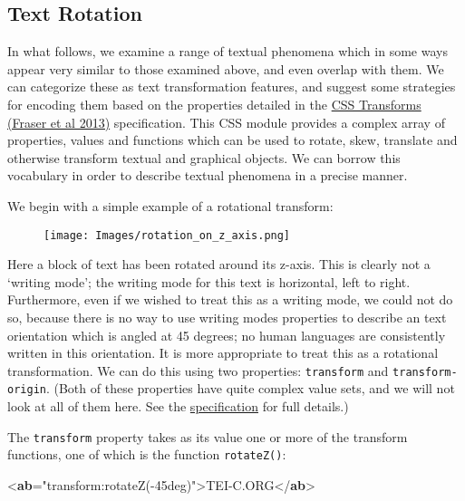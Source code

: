 \subsection[{Text Rotation}]{Text Rotation}\label{WDWMTT}\par
In what follows, we examine a range of textual phenomena which in some ways appear very similar to those examined above, and even overlap with them. We can categorize these as text transformation features, and suggest some strategies for encoding them based on the properties detailed in the \hyperref[CSSTM]{CSS Transforms (Fraser et al 2013)} specification. This CSS module provides a complex array of properties, values and functions which can be used to rotate, skew, translate and otherwise transform textual and graphical objects. We can borrow this vocabulary in order to describe textual phenomena in a precise manner.\par
We begin with a simple example of a rotational transform: \par
\begin{figure}[htbp]
\noindent\noindent\texttt{[image: Images/rotation\_on\_z\_axis.png]}\end{figure}
\par
Here a block of text has been rotated around its z-axis. This is clearly not a ‘writing mode’; the writing mode for this text is horizontal, left to right. Furthermore, even if we wished to treat this as a writing mode, we could not do so, because there is no way to use writing modes properties to describe an text orientation which is angled at 45 degrees; no human languages are consistently written in this orientation. It is more appropriate to treat this as a rotational transformation. We can do this using two properties: \texttt{transform} and \texttt{transform-origin}. (Both of these properties have quite complex value sets, and we will not look at all of them here. See the \hyperref[CSSTM]{specification} for full details.)\par
The \texttt{transform} property takes as its value one or more of the transform functions, one of which is the function \texttt{rotateZ()}:\par\bgroup{}\exampleFont \begin{shaded}\noindent\mbox{}{<\textbf{ab}\hspace*{1em}{style}="{transform:rotateZ(-45deg)}">}TEI-C.ORG{</\textbf{ab}>}\end{shaded}\egroup\par \par
